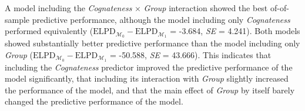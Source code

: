 \documentclass[
  letterpaper,
  DIV=11,
  numbers=noendperiod]{scrartcl}
\begin{document}
A model including the \emph{Cognateness} \(\times\) \emph{Group}
interaction showed the best of-of-sample predictive performance,
although the model including only \emph{Cognateness} performed
equivalently
(\(\text{ELPD}_{\mathcal{M_0}} - \text{ELPD}_{\mathcal{M_1}}\) = -3.684,
\emph{SE} = 4.241). Both models showed substantially better predictive
performance than the model including only \emph{Group}
(\(\text{ELPD}_{\mathcal{M_0}} - \text{ELPD}_{\mathcal{M_1}}\) =
-50.588, \emph{SE} = 43.666). This indicates that including the
\emph{Cognateness} predictor improved the predictive performance of the
model significantly, that including its interaction with \emph{Group}
slightly increased the performance of the model, and that the main
effect of \emph{Group} by itself barely changed the predictive
performance of the model.
\end{document}
